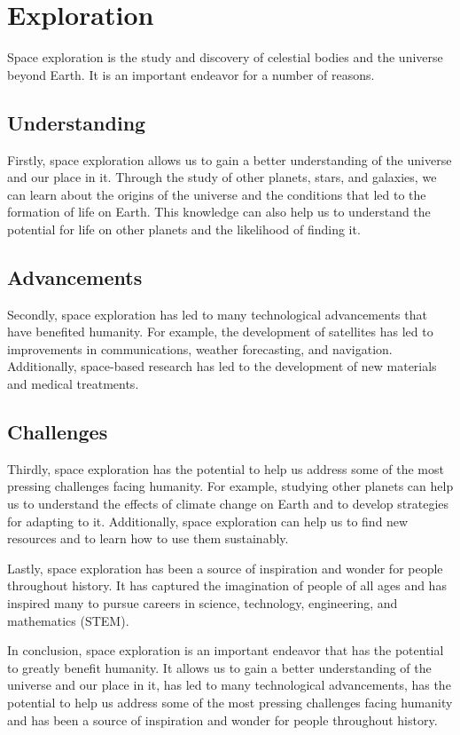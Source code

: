 \section{Exploration}


Space exploration is the study and discovery of celestial bodies and the universe beyond Earth. It is an important endeavor for a number of reasons.


\subsection{Understanding}

Firstly, space exploration allows us to gain a better understanding of the universe and our place in it. Through the study of other planets, stars, and galaxies, we can learn about the origins of the universe and the conditions that led to the formation of life on Earth. This knowledge can also help us to understand the potential for life on other planets and the likelihood of finding it.

\subsection{Advancements}

Secondly, space exploration has led to many technological advancements that have benefited humanity. For example, the development of satellites has led to improvements in communications, weather forecasting, and navigation. Additionally, space-based research has led to the development of new materials and medical treatments.

\subsection{Challenges}
Thirdly, space exploration has the potential to help us address some of the most pressing challenges facing humanity. For example, studying other planets can help us to understand the effects of climate change on Earth and to develop strategies for adapting to it. Additionally, space exploration can help us to find new resources and to learn how to use them sustainably.

Lastly, space exploration has been a source of inspiration and wonder for people throughout history. It has captured the imagination of people of all ages and has inspired many to pursue careers in science, technology, engineering, and mathematics (STEM).

In conclusion, space exploration is an important endeavor that has the potential to greatly benefit humanity. It allows us to gain a better understanding of the universe and our place in it, has led to many technological advancements, has the potential to help us address some of the most pressing challenges facing humanity and has been a source of inspiration and wonder for people throughout history.